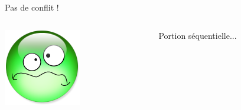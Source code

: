 \documentclass[xcolor={x11names,svgnames},x11names,svgnames]{beamer}
\begin{document}
\begin{frame}[label=sparse_lu_MIS]
\begin{columns}[c]
\begin{column}[c]{.9\textwidth}
      Pas de conflit !
      
    \end{column}
  \end{columns}

  \bigskip
  
  \begin{columns}[c]
    \begin{column}{.1\textwidth}
      \includegraphics[width=\textwidth]{triste.png}
    \end{column}
    \begin{column}[c]{.9\textwidth}

      Portion séquentielle...
      
    \end{column}
  \end{columns}
\end{frame}


\end{document}
